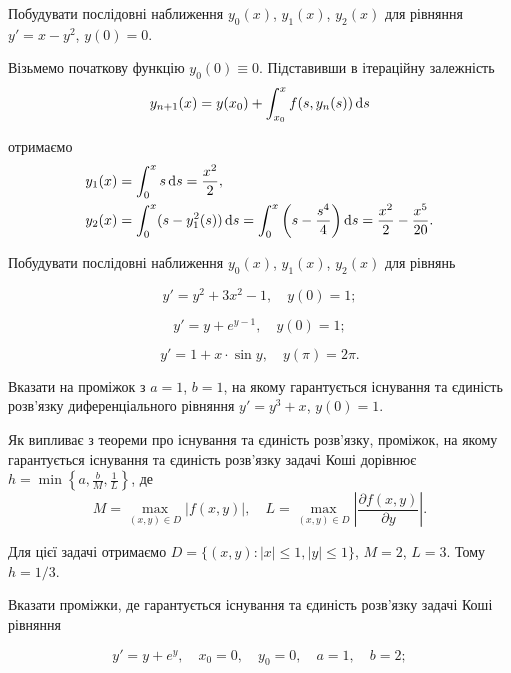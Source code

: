 
\setcounter{problem}{0}
\begin{example}
	Побудувати послідовні наближення $y_0(x)$, $y_1(x)$, $y_2(x)$ для рівняння $y' = x - y^2$, $y(0) = 0$.
\end{example}

\begin{solution}
	Візьмемо початкову функцію $y_0(0) \equiv 0$. Підставивши в ітераційну залежність \[ y_{n+1} (x) = y(x_0) + \int_{x_0}^x f(s, y_n(s)) \mathop{}\!\mathrm{d} s \] 

	отримаємо 
	\begin{align*} 
		y_1(x) &= \int_0^x s \mathop{}\!\mathrm{d} s = \frac{x^2}{2}, \\
		y_2(x) &= \int_0^x (s - y_1^2(s)) \mathop{}\!\mathrm{d} s = \int_0^x \left(s - \frac{s^4}{4}\right) \mathop{}\!\mathrm{d} s = \frac{x^2}{2} - \frac{x^5}{20}.
	\end{align*}
\end{solution}

Побудувати послідовні наближення $y_0(x)$, $y_1(x)$, $y_2(x)$ для рівнянь
\begin{problem}
	\[y' = y^2 + 3x^2 - 1, \quad y(0) = 1;\]
\end{problem}

\begin{problem}
	\[y'=y+e^{y-1},\quad y(0)=1;\]
\end{problem}

\begin{problem}
	\[y'=1+x\cdot\sin y, \quad y(\pi)=2\pi.\]
\end{problem}

\begin{example}
	Вказати на проміжок з $a=1$, $b=1$, на якому гарантується існування та єдиність розв'язку диференціального рівняння $y'=y^3+x$, $y(0)=1$.
\end{example}

\begin{solution}
	Як випливає з теореми про існування та єдиність розв'язку, проміжок, на якому гарантується існування та єдиність розв'язку задачі Коші дорівнює $h = \min \left\{ a, \frac{b}{M}, \frac{1}{L}\right\}$, де \[ M = \max_{(x,y)\in D} |f(x,y)|, \quad L = \max_{(x,y)\in D} \left|\frac{\partial f(x,y)}{\partial y}\right|.\]

	Для цієї задачі отримаємо $D = \{ (x,y): |x| \le 1, |y| \le 1\}$, $M=2$, $L=3$. Тому $h = 1/3$.
\end{solution}	

Вказати проміжки, де гарантується існування та єдиність розв'язку задачі Коші рівняння
\begin{problem}
	\[y'=y+e^y,\quad x_0=0, \quad y_0=0,\quad a=1,\quad b=2;\]
\end{problem}

